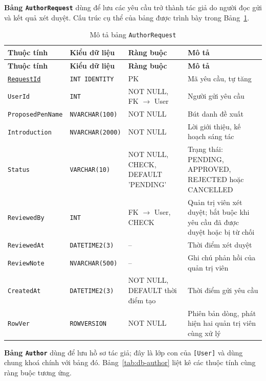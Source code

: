 \textbf{Bảng \texttt{AuthorRequest}} dùng để lưu các yêu cầu trở thành tác giả do người đọc gửi và kết quả xét duyệt. Cấu trúc cụ thể của bảng được trình bày trong Bảng~\ref{tab:db-author-request}.


{\small
\renewcommand{\arraystretch}{1.2}
\begin{longtable}{|>{\raggedright\arraybackslash}p{3.1cm}|>{\raggedright\arraybackslash}p{2.7cm}|>{\raggedright\arraybackslash}p{4.0cm}|>{\raggedright\arraybackslash}p{5.4cm}|}
\caption{Mô tả bảng \texttt{AuthorRequest}}\label{tab:db-author-request}\\
\hline
\textbf{Thuộc tính} & \textbf{Kiểu dữ liệu} & \textbf{Ràng buộc} & \textbf{Mô tả} \\ \hline
\endfirsthead
\hline
\textbf{Thuộc tính} & \textbf{Kiểu dữ liệu} & \textbf{Ràng buộc} & \textbf{Mô tả} \\ \hline
\endhead
\underline{\texttt{RequestId}} & \texttt{INT IDENTITY} & PK & Mã yêu cầu, tự tăng \\ \hline
\texttt{UserId} & \texttt{INT} & NOT NULL, FK $\rightarrow$ User & Người gửi yêu cầu \\ \hline
\texttt{ProposedPenName} & \texttt{NVARCHAR(100)} & NOT NULL & Bút danh đề xuất \\ \hline
\texttt{Introduction} & \texttt{NVARCHAR(2000)} & NOT NULL & Lời giới thiệu, kế hoạch sáng tác \\ \hline
\texttt{Status} & \texttt{VARCHAR(10)} & NOT NULL, CHECK, DEFAULT 'PENDING' & Trạng thái: PENDING, APPROVED, REJECTED hoặc CANCELLED \\ \hline
\texttt{ReviewedBy} & \texttt{INT} & FK $\rightarrow$ User, CHECK & Quản trị viên xét duyệt; bắt buộc khi yêu cầu đã được duyệt hoặc bị từ chối \\ \hline
\texttt{ReviewedAt} & \texttt{DATETIME2(3)} & -- & Thời điểm xét duyệt \\ \hline
\texttt{ReviewNote} & \texttt{NVARCHAR(500)} & -- & Ghi chú phản hồi của quản trị viên \\ \hline
\texttt{CreatedAt} & \texttt{DATETIME2(3)} & NOT NULL, DEFAULT thời điểm tạo & Thời điểm gửi yêu cầu \\ \hline
\texttt{RowVer} & \texttt{ROWVERSION} & NOT NULL & Phiên bản dòng, phát hiện hai quản trị viên cùng xử lý \\ \hline
\end{longtable}
}

\textbf{Bảng \texttt{Author}} dùng để lưu hồ sơ tác giả; đây là lớp con của \texttt{[User]} và dùng chung khoá chính với bảng đó. Bảng~\ref{tab:db-author} liệt kê các thuộc tính cùng ràng buộc tương ứng.


